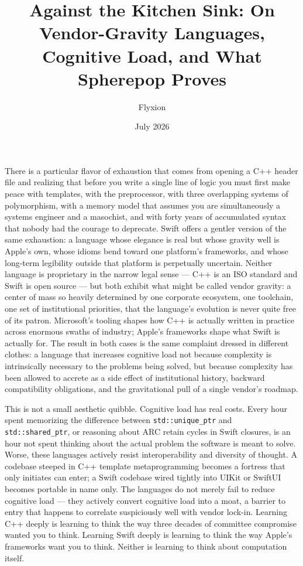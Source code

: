 \documentclass[11pt]{article}
\title{Against the Kitchen Sink: On Vendor-Gravity Languages, Cognitive Load, and What Spherepop Proves}
\author{Flyxion}
\date{July 2026}
\begin{document}
\maketitle

There is a particular flavor of exhaustion that comes from opening a C++ header file and realizing that before you write a single line of logic you must first make peace with templates, with the preprocessor, with three overlapping systems of polymorphism, with a memory model that assumes you are simultaneously a systems engineer and a masochist, and with forty years of accumulated syntax that nobody had the courage to deprecate. Swift offers a gentler version of the same exhaustion: a language whose elegance is real but whose gravity well is Apple's own, whose idioms bend toward one platform's frameworks, and whose long-term legibility outside that platform is perpetually uncertain. Neither language is proprietary in the narrow legal sense --- C++ is an ISO standard and Swift is open source --- but both exhibit what might be called vendor gravity: a center of mass so heavily determined by one corporate ecosystem, one toolchain, one set of institutional priorities, that the language's evolution is never quite free of its patron. Microsoft's tooling shapes how C++ is actually written in practice across enormous swaths of industry; Apple's frameworks shape what Swift is actually for. The result in both cases is the same complaint dressed in different clothes: a language that increases cognitive load not because complexity is intrinsically necessary to the problems being solved, but because complexity has been allowed to accrete as a side effect of institutional history, backward compatibility obligations, and the gravitational pull of a single vendor's roadmap.

This is not a small aesthetic quibble. Cognitive load has real costs. Every hour spent memorizing the difference between \texttt{std::unique\_ptr} and \texttt{std::shared\_ptr}, or reasoning about ARC retain cycles in Swift closures, is an hour not spent thinking about the actual problem the software is meant to solve. Worse, these languages actively resist interoperability and diversity of thought. A codebase steeped in C++ template metaprogramming becomes a fortress that only initiates can enter; a Swift codebase wired tightly into UIKit or SwiftUI becomes portable in name only. The languages do not merely fail to reduce cognitive load --- they actively convert cognitive load into a moat, a barrier to entry that happens to correlate suspiciously well with vendor lock-in. Learning C++ deeply is learning to think the way three decades of committee compromise wanted you to think. Learning Swift deeply is learning to think the way Apple's frameworks want you to think. Neither is learning to think about computation itself.
\end{document}
